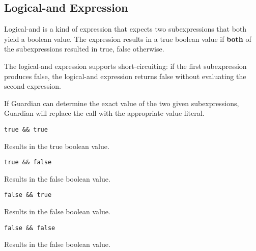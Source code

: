 
\subsection{Logical-and Expression}
{
	Logical-and is a kind of expression that expects two subexpressions that
	both yield a boolean value. The expression results in a true boolean value
	if \textbf{both} of the subexpressions resulted in true, false otherwise.
	
	The logical-and expression supports short-circuiting: if the first
	subexpression produces false, the logical-and expression returns false
	without evaluating the second expression.
	
	If Guardian can determine the exact value of the two given subexpressions,
	Guardian will replace the call with the appropriate value literal.
	
	\begin{itemize}
	{
		\item[] \texttt{true \&\& true}
		
			Results in the true boolean value.
			
		\item[] \texttt{true \&\& false}
		
			Results in the false boolean value.
			
		\item[] \texttt{false \&\& true}
		
			Results in the false boolean value.
			
		\item[] \texttt{false \&\& false}
		
			Results in the false boolean value.
	}
	\end{itemize}
}
